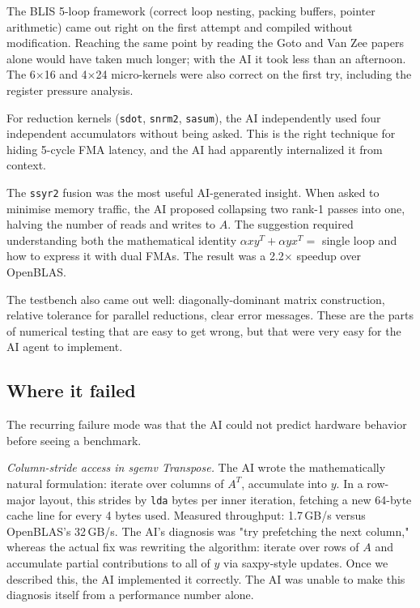 \documentclass[11pt,a4paper]{article}
\begin{document}
The BLIS 5-loop framework (correct loop nesting, packing buffers, pointer arithmetic)
came out right on the first attempt and compiled without modification.
Reaching the same point by reading the Goto and Van Zee papers alone
would have taken much longer; with the AI it took less than an afternoon.
The 6$\times$16 and 4$\times$24 micro-kernels were also correct on the first try,
including the register pressure analysis.

For reduction kernels (\texttt{sdot}, \texttt{snrm2}, \texttt{sasum}), the AI
independently used four independent accumulators without being asked.
This is the right technique for hiding 5-cycle FMA latency, and the AI had
apparently internalized it from context.

The \texttt{ssyr2} fusion was the most useful AI-generated insight.
When asked to minimise memory traffic, the AI proposed collapsing two rank-1
passes into one, halving the number of reads and writes to $A$.
The suggestion required understanding both the mathematical identity
$\alpha xy^T + \alpha yx^T = $ single loop and how to express it with dual FMAs.
The result was a 2.2$\times$ speedup over OpenBLAS.

The testbench also came out well: diagonally-dominant matrix construction, relative
tolerance for parallel reductions, clear error messages.
These are the parts of numerical testing that are easy to get wrong,
but that were very easy for the AI agent to implement.

\subsection*{Where it failed}

The recurring failure mode was that the AI could not predict hardware behavior
before seeing a benchmark.

\textit{Column-stride access in sgemv Transpose.}
The AI wrote the mathematically natural formulation:
iterate over columns of $A^T$, accumulate into $y$.
In a row-major layout, this strides by \texttt{lda} bytes per inner iteration,
fetching a new 64-byte cache line for every 4 bytes used.
Measured throughput: 1.7\,GB/s versus OpenBLAS's 32\,GB/s.
The AI's diagnosis was "try prefetching the next column,"
whereas the actual fix was rewriting the algorithm: iterate over rows of $A$
and accumulate partial contributions to all of $y$ via saxpy-style updates.
Once we described this, the AI implemented it correctly.
The AI was unable to make this diagnosis itself
from a performance number alone.
\end{document}
